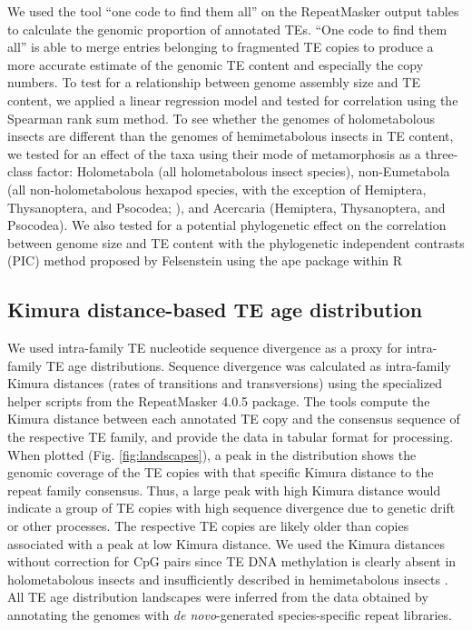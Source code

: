 We used the tool ``one code to find them all'' \citep{Bailly-Bechet2014}
on the RepeatMasker output tables to calculate the genomic proportion of
annotated TEs. ``One code to find them all'' is able to merge entries
belonging to fragmented TE copies to produce a more accurate estimate of
the genomic TE content and especially the copy numbers. To test for a
relationship between genome assembly size and TE content, we applied a
linear regression model and tested for correlation using the Spearman
rank sum method. To see whether the genomes of holometabolous insects
are different than the genomes of hemimetabolous insects in TE content,
we tested for an effect of the taxa using their mode of metamorphosis as
a three-class factor: Holometabola (all holometabolous insect species),
non-Eumetabola (all non-holometabolous hexapod species, with the
exception of Hemiptera, Thysanoptera, and Psocodea; \citep{Beutel2013}),
and Acercaria (Hemiptera, Thysanoptera, and Psocodea). We also tested
for a potential phylogenetic effect on the correlation between genome
size and TE content with the phylogenetic independent contrasts (PIC)
method proposed by Felsenstein \citep{Felsenstein1985} using the ape
package \citep{Paradis2004} within R \citep{RCoreTeam2017}





\subsection{Kimura distance-based TE age distribution}

We used intra-family TE nucleotide sequence divergence as a proxy for
intra-family TE age distributions. Sequence divergence was calculated as
intra-family Kimura distances (rates of transitions and transversions)
using the specialized helper scripts from the RepeatMasker 4.0.5
package. The tools compute the Kimura distance between each annotated TE
copy and the consensus sequence of the respective TE family, and provide
the data in tabular format for processing. When plotted (Fig.
\ref{fig:landscapes}), a peak in the distribution shows the genomic
coverage of the TE copies with that specific Kimura distance to the
repeat family consensus. Thus, a large peak with high Kimura distance
would indicate a group of TE copies with high sequence divergence due to
genetic drift or other processes.  The respective TE copies are likely
older than copies associated with a peak at low Kimura distance. We used
the Kimura distances without correction for CpG pairs since TE DNA
methylation is clearly absent in holometabolous insects and
insufficiently described in hemimetabolous insects \citep{Glastad2014}.
All TE age distribution landscapes were inferred from the data obtained
by annotating the genomes with \emph{de novo}-generated species-specific
repeat libraries.

